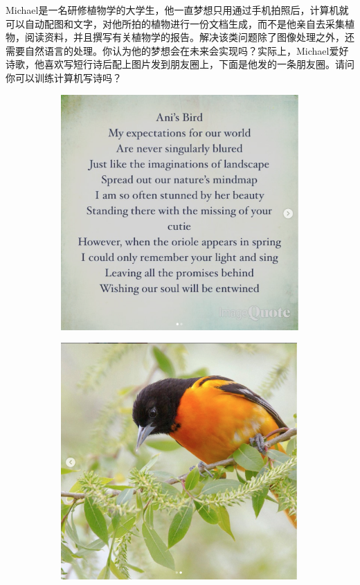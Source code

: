 \documentclass[12pt]{article}
\numberwithin{figure}{section}
\newenvironment{fullmodel}{
			\smallskip\noindent
			\begin{minipage}{\textwidth+\marginparwidth+\marginparsep}\smallskip\smallskip}
			{\smallskip\smallskip\end{minipage}\vspace{.1in}
			}
\numberwithin{equation}{section}
\newenvironment{question}[2][Question]{\begin{trivlist}
\item[\hskip \labelsep {\bfseries #1}\hskip \labelsep {\bfseries #2.}]}{\end{trivlist}}
\begin{document}
\begin{fullmodel}
\begin{question}{思考题C3-Q1}
	Michael是一名研修植物学的大学生，他一直梦想只用通过手机拍照后，计算机就可以自动配图和文字，对他所拍的植物进行一份文档生成，而不是他亲自去采集植物，阅读资料，并且撰写有关植物学的报告。解决该类问题除了图像处理之外，还需要自然语言的处理。你认为他的梦想会在未来会实现吗？实际上，Michael爱好诗歌，他喜欢写短行诗后配上图片发到朋友圈上，下面是他发的一条朋友圈。请问你可以训练计算机写诗吗？
	\begin{figure}[H]
		\centering
		\begin{subfigure}[b]{0.45\textwidth}
			\centering
			\includegraphics[width=\textwidth]{fig/poetry1}
		\end{subfigure}
		\begin{subfigure}[b]{0.45\textwidth}
			\includegraphics[width=0.99\textwidth]{fig/peotry2}

\end{subfigure}
\end{figure}
\end{question}
\end{fullmodel}
\end{document}
